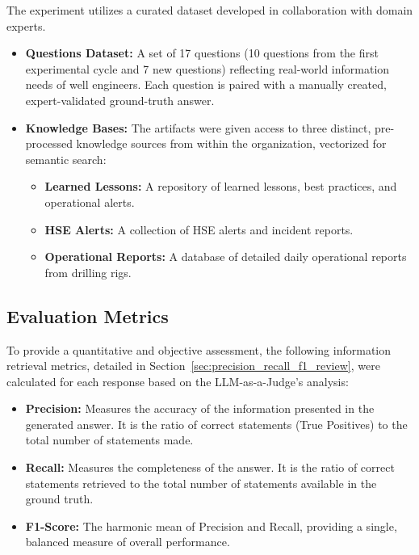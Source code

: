         The experiment utilizes a curated dataset developed in collaboration with domain experts.
        \begin{itemize}
            \item \textbf{Questions Dataset:} A set of 17 questions (10 questions from the first experimental cycle and 7 new questions) reflecting real-world information needs of well engineers. Each question is paired with a manually created, expert-validated ground-truth answer.
            \item \textbf{Knowledge Bases:} The artifacts were given access to three distinct, pre-processed knowledge sources from within the organization, vectorized for semantic search:
            \begin{itemize}
                \item \textbf{Learned Lessons:} A repository of learned lessons, best practices, and operational alerts.
                \item \textbf{HSE Alerts:} A collection of HSE alerts and incident reports.
                \item \textbf{Operational Reports:} A database of detailed daily operational reports from drilling rigs.
            \end{itemize}
        \end{itemize}

    \subsection{Evaluation Metrics}

        To provide a quantitative and objective assessment, the following information retrieval metrics, detailed in Section~\ref{sec:precision_recall_f1_review}, were calculated for each response based on the LLM-as-a-Judge's analysis:
        \begin{itemize}
            \item \textbf{Precision:} Measures the accuracy of the information presented in the generated answer. It is the ratio of correct statements (True Positives) to the total number of statements made. 
            \item \textbf{Recall:} Measures the completeness of the answer. It is the ratio of correct statements retrieved to the total number of statements available in the ground truth.
            \item \textbf{F1-Score:} The harmonic mean of Precision and Recall, providing a single, balanced measure of overall performance.
        \end{itemize}

